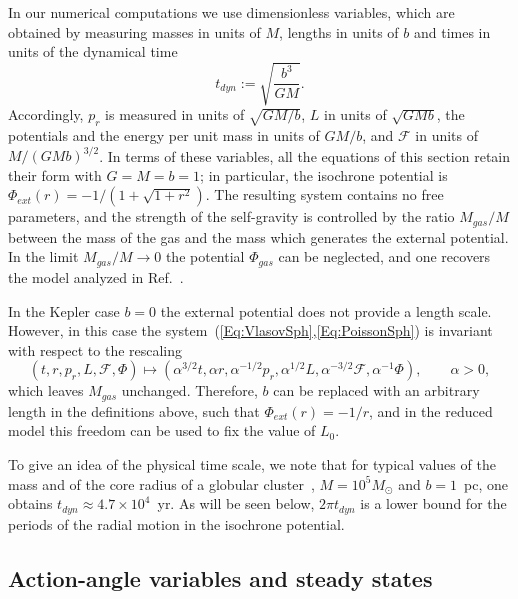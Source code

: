 In our numerical computations we use dimensionless variables, which are obtained by measuring masses in units of $M$, lengths in units of $b$ and times in units of the dynamical time
\begin{equation}
t_{dyn} := \sqrt{\frac{b^3}{GM}}.
\label{Eq:tdyn}
\end{equation}
Accordingly, $p_r$ is measured in units of $\sqrt{GM/b}$, $L$ in units of $\sqrt{GMb}$, the potentials and the energy per unit mass in units of $GM/b$, and $\mathcal{F}$ in units of $M/(GMb)^{3/2}$. In terms of these variables, all the equations of this section retain their form with $G = M = b = 1$; in particular, the isochrone potential is $\Phi_{ext}(r) = -1/(1 + \sqrt{1 + r^2})$. The resulting system contains no free parameters, and the strength of the self-gravity is controlled by the ratio $M_{gas}/M$ between the mass of the gas and the mass which generates the external potential. In the limit $M_{gas}/M\to 0$ the potential $\Phi_{gas}$ can be neglected, and one recovers the model analyzed in Ref.~\cite{pRoS20}.

In the Kepler case $b = 0$ the external potential does not provide a length scale. However, in this case the system~(\ref{Eq:VlasovSph},\ref{Eq:PoissonSph}) is invariant with respect to the rescaling
\begin{equation}
(t,r,p_r,L,\mathcal{F},\Phi)\mapsto \left( \alpha^{3/2} t,\alpha r,\alpha^{-1/2} p_r,\alpha^{1/2} L,\alpha^{-3/2}\mathcal{F},\alpha^{-1}\Phi \right),\qquad \alpha > 0,
\label{Eq:Rescaling}
\end{equation}
which leaves $M_{gas}$ unchanged. Therefore, $b$ can be replaced with an arbitrary length in the definitions above, such that $\Phi_{ext}(r) = -1/r$, and in the reduced model this freedom can be used to fix the value of $L_0$.

To give an idea of the physical time scale, we note that for typical values of the mass and of the core radius of a globular cluster~\cite{BinneyTremaine-Book}, $M = 10^5 M_\odot$ and $b = 1$~pc, one obtains $t_{dyn}\approx 4.7\times 10^4$~yr. As will be seen below, $2\pi t_{dyn}$ is a lower bound for the periods of the radial motion in the isochrone potential.


\subsection{Action-angle variables and steady states}
\label{SubSec:AA}

